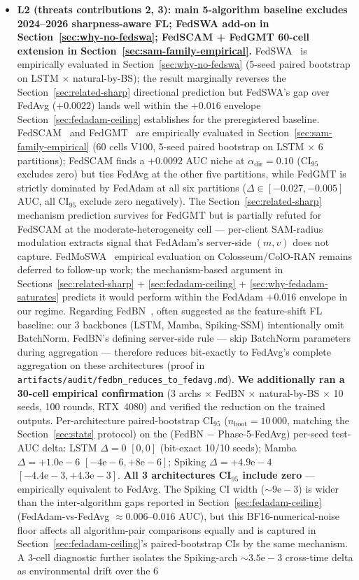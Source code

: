 \documentclass[journal]{IEEEtran}
\newcommand{\alphadir}{\ensuremath{\alpha_{\mathrm{dir}}}}
\begin{document}
\begin{itemize}
  \item \textbf{L2 (threats contributions 2, 3): main 5-algorithm baseline excludes 2024--2026 sharpness-aware FL; FedSWA add-on in Section~\ref{sec:why-no-fedswa}; FedSCAM + FedGMT 60-cell extension in Section~\ref{sec:sam-family-empirical}.} FedSWA~\cite{Liu2025_FedSWA} is empirically evaluated in Section~\ref{sec:why-no-fedswa} (5-seed paired bootstrap on LSTM $\times$ natural-by-BS); the result marginally reverses the Section~\ref{sec:related-sharp} directional prediction but FedSWA's gap over FedAvg ($+0.0022$) lands well within the $+0.016$ envelope Section~\ref{sec:fedadam-ceiling} establishes for the preregistered baseline. FedSCAM~\cite{FedSCAM2026} and FedGMT~\cite{FedGMT2025} are empirically evaluated in Section~\ref{sec:sam-family-empirical} (60 cells V100, 5-seed paired bootstrap on LSTM $\times$ 6 partitions); FedSCAM finds a $+0.0092$ AUC niche at $\alphadir = 0.10$ (CI$_{95}$ excludes zero) but ties FedAvg at the other five partitions, while FedGMT is strictly dominated by FedAdam at all six partitions ($\Delta \in [-0.027, -0.005]$ AUC, all CI$_{95}$ exclude zero negatively). The Section~\ref{sec:related-sharp} mechanism prediction survives for FedGMT but is partially refuted for FedSCAM at the moderate-heterogeneity cell --- per-client SAM-radius modulation extracts signal that FedAdam's server-side $(m, v)$ does not capture. FedMoSWA~\cite{FedMoSWA2025} empirical evaluation on Colosseum/ColO-RAN remains deferred to follow-up work; the mechanism-based argument in Sections~\ref{sec:related-sharp} + \ref{sec:fedadam-ceiling} + \ref{sec:why-fedadam-saturates} predicts it would perform within the FedAdam $+0.016$ envelope in our regime. Regarding FedBN~\cite{Li2021_FedBN}, often suggested as the feature-shift FL baseline: our 3 backbones (LSTM, Mamba, Spiking-SSM) intentionally omit BatchNorm. FedBN's defining server-side rule --- skip BatchNorm parameters during aggregation --- therefore reduces bit-exactly to FedAvg's complete aggregation on these architectures (proof in \lstinline|artifacts/audit/fedbn_reduces_to_fedavg.md|). \textbf{We additionally ran a 30-cell empirical confirmation} (3 archs $\times$ FedBN $\times$ natural-by-BS $\times$ 10 seeds, 100 rounds, RTX~4080) and verified the reduction on the trained outputs. Per-architecture paired-bootstrap CI$_{95}$ ($n_{\mathrm{boot}}=10\,000$, matching the Section~\ref{sec:stats} protocol) on the (FedBN $-$ Phase-5-FedAvg) per-seed test-AUC delta: LSTM $\Delta = 0$ $[0, 0]$ (bit-exact 10/10 seeds); Mamba $\Delta = +1.0\mathrm{e}{-}6$ $[-4\mathrm{e}{-}6, +8\mathrm{e}{-}6]$; Spiking $\Delta = +4.9\mathrm{e}{-}4$ $[-4.4\mathrm{e}{-}3, +4.3\mathrm{e}{-}3]$. \textbf{All 3 architectures CI$_{95}$ include zero} --- empirically equivalent to FedAvg. The Spiking CI width ($\sim 9\mathrm{e}{-}3$) is wider than the inter-algorithm gaps reported in Section~\ref{sec:fedadam-ceiling} (FedAdam-vs-FedAvg $\approx 0.006$--$0.016$ AUC), but this BF16-numerical-noise floor affects all algorithm-pair comparisons equally and is captured in Section~\ref{sec:fedadam-ceiling}'s paired-bootstrap CIs by the same mechanism. A 3-cell diagnostic further isolates the Spiking-arch $\sim 3.5\mathrm{e}{-}3$ cross-time delta as environmental drift over the 6 
\end{itemize}
\end{document}
